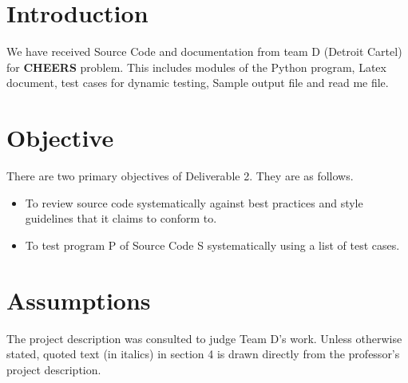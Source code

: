 \section{Introduction}
 We have received Source Code and documentation from team D (Detroit Cartel) for \textbf {CHEERS} problem. This includes modules of the Python program, Latex document, test cases for dynamic testing, Sample output file and read me file. 
 \section{Objective}

 There are two primary objectives of Deliverable 2. They are as follows.
 \begin{itemize}
    \item To review source code systematically against best practices and style guidelines that it claims to conform to.
    \item To test program P of Source Code S systematically using a list of test cases.
 \end{itemize}
\section{Assumptions}
\begin{flushleft}
   The project description was consulted to judge Team D's work. Unless otherwise stated, quoted text (in italics) in section 4 is drawn directly from the  professor's project description.
\end{flushleft}